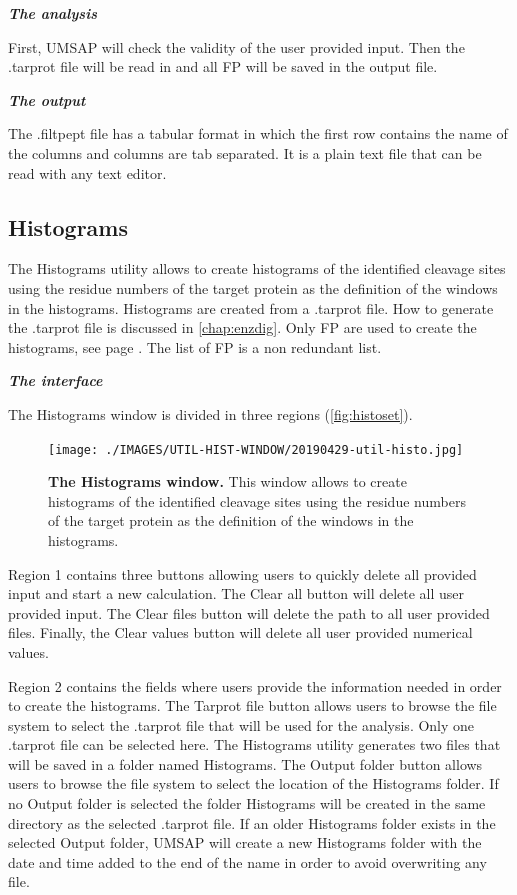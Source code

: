 \textit{\textbf{The analysis}}

First, UMSAP will check the validity of the user provided input. Then the .tarprot file will be read in and all FP will be saved in the output file.

\textit{\textbf{The output}}

The .filtpept file has a tabular format in which the first row contains the name of the columns and columns are tab separated. It is a plain text file that can be read with any text editor.

\subsection{Histograms}
\label{subsec:histocut}
The Histograms utility allows to create histograms of the identified cleavage sites using the residue numbers of the target protein as the definition of the windows in the histograms. Histograms are created from a .tarprot file. How to generate the .tarprot file is discussed in \autoref{chap:enzdig}. Only FP are used to create the histograms, see page \pageref{par:PIP}. The list of FP is a non redundant list. 

\textit{\textbf{The interface}}

The Histograms window is divided in three regions (\autoref{fig:histoset}).

\begin{figure}[h]
	\centering
	\texttt{[image: ./IMAGES/UTIL-HIST-WINDOW/20190429-util-histo.jpg]}	    
	\caption[The Histograms window]{\textbf{The Histograms window.} This window allows to create histograms of the identified cleavage sites using the residue numbers of the target protein as the definition of the windows in the histograms.} 
	\label{fig:histoset}
	\vspace{-5pt} 	
\end{figure}

Region \num{1} contains three buttons allowing users to quickly delete all provided input and start a new calculation. The Clear all button will delete all user provided input. The Clear files button will delete the path to all user provided files. Finally, the Clear values button will delete all user provided numerical values.

Region \num{2} contains the fields where users provide the information needed in order to create the histograms. The Tarprot file button allows users to browse the file system to select the .tarprot file that will be used for the analysis. Only one .tarprot file can be selected here. The Histograms utility generates two files that will be saved in a folder named Histograms. The Output folder button allows users to browse the file system to select the location of the Histograms folder. If no Output folder is selected the folder Histograms will be created in the same directory as the selected .tarprot file. If an older Histograms folder exists in the selected Output folder, UMSAP will create a new Histograms folder with the date and time added to the end of the name in order to avoid overwriting any file. 

